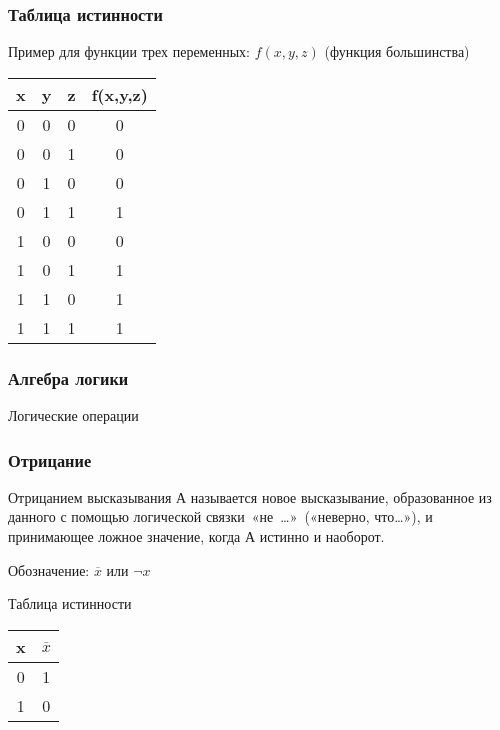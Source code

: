 \begin{frame}
\end{frame}


\begin{frame}
\frametitle{Таблица истинности}

Пример для функции трех переменных: $f(x,y,z)$ (функция большинства)

\begin{tabular}{|c|c|c|c|}
\hline 
x & y & z & f(x,y,z)\tabularnewline
\hline 
0 & 0 & 0 & 0\tabularnewline
\hline 
0 & 0 & 1 & 0\tabularnewline
\hline 
0 & 1 & 0 & 0\tabularnewline
\hline 
0 & 1 & 1 & 1\tabularnewline
\hline 
1 & 0 & 0 & 0\tabularnewline
\hline 
1 & 0 & 1 & 1\tabularnewline
\hline 
1 & 1 & 0 & 1\tabularnewline
\hline 
1 & 1 & 1 & 1\tabularnewline
\hline 
\end{tabular}


\end{frame}




\begin{frame}


\frametitle{Алгебра логики}

\begin{center}

\Huge
Логические операции	
\end{center}


\end{frame}

\begin{frame}
\frametitle{Отрицание}

Отрицанием высказывания А называется новое высказывание, образованное из данного с помощью логической связки~«не~…»~(«неверно, что…»), и принимающее ложное значение, когда А истинно и наоборот.

Обозначение: $\overline{x}$ или $\neg x$

Таблица истинности

\begin{tabular}{|c|c|}
\hline 
x & $\overline{x}$\tabularnewline
\hline 
0 & 1\tabularnewline
\hline 
1 & 0\tabularnewline
\hline 
\end{tabular}

\end{frame}

